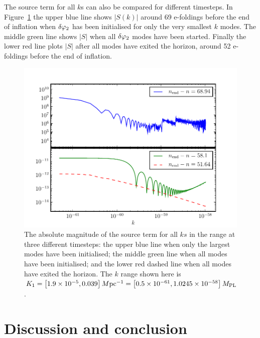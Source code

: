 The source term for all $k$s can also be compared for different timesteps. In
Figure~\ref{fig:src-3ns} the upper blue line shows $|S(k)|$ around 69 e-foldings before the end of
inflation when $\delta\varphi_{2}$ has been initialised for only the very smallest $k$ modes. The middle green
line shows $|S|$ when all $\delta\varphi_{2}$ modes have been started. Finally the lower red line plots $|S|$
after all modes have exited the horizon, around 52 e-foldings before the end of inflation.
\begin{figure}
\includegraphics[scale=0.8]{numerical/graphs/src_3ns}
\caption{The absolute magnitude of the source term for all $ks$ in the range at three different
timesteps: the upper blue line when only the largest modes have been initialised; the middle green
line when all modes have been initialised; and the lower red dashed line when all modes have
exited the horizon. The $k$ range shown here is $K_1=\left[ 1.9\times 10^{-5}, 0.039 \right] M \mathrm{pc}^{-1}= 
 \left[0.5\times 10^{-61}, 1.0245\times 10^{-58}\right]M_{\mathrm{PL}}$.}
\label{fig:src-3ns}
\end{figure}
% 

% 
% 
% 
\section{Discussion and conclusion}
\label{sec:disc-num}

